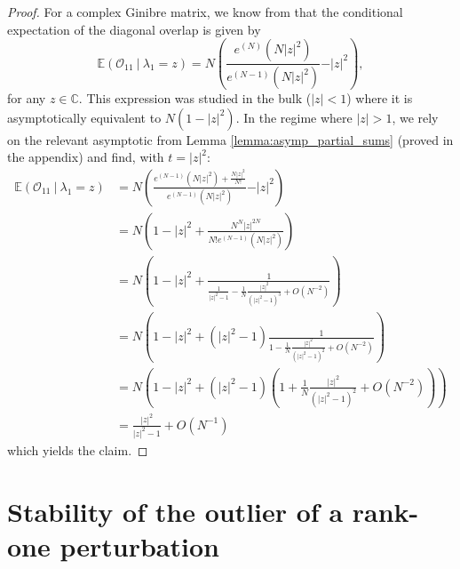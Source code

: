 \documentclass[12pt,a4paper]{amsart}
\theoremstyle{plain} %
\newcommand{\E}{\mathbb{E}}
\newcommand{\CC}{\mathbb{C}}
\newcommand{\Ov}{\mathscr{O}}
\newcommand{\la}{\lambda}
\begin{document}
\begin{proof}
For a complex Ginibre matrix, we know from \cite{Akemann_determinantal,BourgadeDubach,ChalkerMehlig} 
that the conditional expectation of the diagonal overlap is given by 
\begin{equation}
\mathbb{E} \left( \Ov_{11} \ \vert \ \lambda_1 = z \right) 
= N \left( \frac{e^{(N)}(N\vert z\vert^2)}{e^{(N-1)}(N\vert z\vert^2)} - \vert z\vert^2 \right),    
\end{equation}
for any $z \in \CC$. This expression was studied in the bulk ($|z|<1$) where it is asymptotically equivalent to $N (1-|z|^2)$.
In the regime where $|z|>1$, we rely on the relevant asymptotic from Lemma \ref{lemma:asymp_partial_sums} (proved in the appendix) and find, with $t=|z|^2$:
\begin{align*}
    \E \left( \Ov_{11} \ | \ \la_1 = z \right) & = N \left( \frac{e^{(N-1)}(N\vert z\vert^2) + \frac{N |z|^2}{N!}}{e^{(N-1)}(N\vert z\vert^2)} - \vert z\vert^2 \right)  \\
    & = N \left( 1- |z|^2 + \frac{N^N |z|^{2N}}{N! e^{(N-1)} (N|z|^2)} \right) \\
    & = N \left( 1- |z|^2 + \frac{1}{\frac{1}{|z|^2-1} - \frac{1}{N} \frac{|z|^2}{(|z|^2-1)^3} + O(N^{-2})} \right) \\
    & = N \left( 1- |z|^2 + (|z|^2-1) \frac{1}{1 - \frac{1}{N} \frac{|z|^2}{(|z|^2-1)^2} + O(N^{-2})} \right) \\
    & = N \left( 1- |z|^2 + (|z|^2-1) \left( 1 + \frac{1}{N} \frac{|z|^2}{(|z|^2-1)^2} + O(N^{-2}) \right) \right) \\
    & = \frac{|z|^2}{|z|^2-1} + O(N^{-1})
\end{align*}
which yields the claim.
\end{proof}

\newpage
\section{Stability of the outlier of a rank-one perturbation}\label{sec_perturbed}
\end{document}
